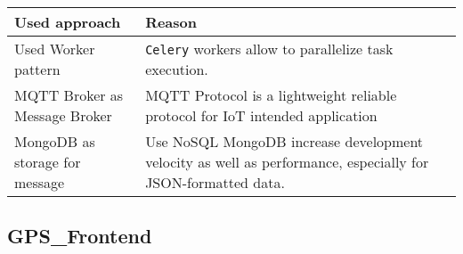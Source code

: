\begin{longtable}[]{@{}ll@{}}
\toprule
\begin{minipage}[b]{0.47\columnwidth}\raggedright
Used approach\strut
\end{minipage} & \begin{minipage}[b]{0.47\columnwidth}\raggedright
Reason\strut
\end{minipage}\tabularnewline
\midrule
\endhead
\begin{minipage}[t]{0.47\columnwidth}\raggedright
Used Worker pattern\strut
\end{minipage} & \begin{minipage}[t]{0.47\columnwidth}\raggedright
\texttt{Celery} workers allow to parallelize task execution.\strut
\end{minipage}\tabularnewline
\begin{minipage}[t]{0.47\columnwidth}\raggedright
MQTT Broker as Message Broker\strut
\end{minipage} & \begin{minipage}[t]{0.47\columnwidth}\raggedright
MQTT Protocol is a lightweight reliable protocol for IoT intended
application\strut
\end{minipage}\tabularnewline
\begin{minipage}[t]{0.47\columnwidth}\raggedright
MongoDB as storage for message\strut
\end{minipage} & \begin{minipage}[t]{0.47\columnwidth}\raggedright
Use NoSQL MongoDB increase development velocity as well as performance,
especially for JSON-formatted data.\strut
\end{minipage}\tabularnewline
\bottomrule
\end{longtable}

\subsection{GPS\_Frontend}\label{gps_frontend}

